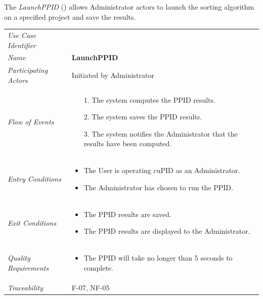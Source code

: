 \documentclass[12pt,letterpaper]{article}
\begin{document}
\vspace{1em}
The {\it LaunchPPID} () allows Administrator actors to launch the sorting algorithm on a specified project and save the results.

\begin{center}
	\begin{tabu} to 
		\toprule
		Use Case Identifier &  \\
		Name & {\bf LaunchPPID} \\
		Participating Actors & Initiated by Administrator \\
		Flow of Events & 
		\begin{minipage}[t]{\linewidth}
		    \begin{enumerate}
			    \item[1.] The system computes the PPID results.
			    \item[2.] The system saves the PPID results.
			    \item[3.] The system notifies the Administrator that the results have been computed.
			\end{enumerate}
	    \end{minipage} \\

		Entry Conditions &
		\begin{minipage}[t]{\linewidth}
			\begin{itemize}
			    \item The User is operating cuPID as an Administrator.
			    \item The Administrator has chosen to run the PPID.
	        \end{itemize}
	    \end{minipage} \\

		Exit Conditions &
		\begin{minipage}[t]{\linewidth}
			\begin{itemize}
			    \item The PPID results are saved.
			    \item The PPID results are displayed to the Administrator.
	        \end{itemize}
	    \end{minipage} \\

		Quality Requirements &
		\begin{minipage}[t]{\linewidth}
			\begin{itemize}
			    \item The PPID will take no longer than 5 seconds to complete.
	        \end{itemize}
	    \end{minipage} \\

		Traceability & F-07, NF-05 \\
		\toprule
	\end{tabu}
\end{center}
\end{document}
